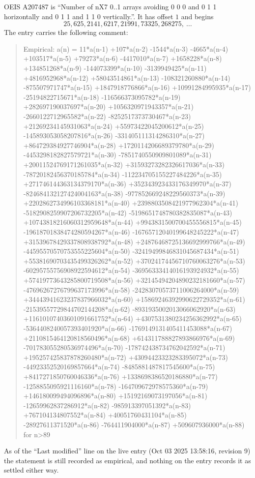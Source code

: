 \documentclass[11pt,a4paper]{article}
\theoremstyle{plain}
\theoremstyle{definition}
\begin{document}
OEIS A207487 is ``Number of nX7 0..1 arrays avoiding 0 0 0 and 0 1 1 horizontally and 0 1 1 and 1 1 0 vertically.''. It has offset
$1$ and begins
\[
25, 625, 2141, 6217, 21991, 73325, 268275,\ \dots
\]
The entry carries the following comment:
\begin{quote}\small
Empirical: a(n) = 11*a(n-1) +107*a(n-2) -1544*a(n-3) -4665*a(n-4) +103517*a(n-5) +79273*a(n-6) -4417010*a(n-7) +1658228*a(n-8) +134851268*a(n-9) -144073399*a(n-10) -3139949425*a(n-11) +4816952968*a(n-12) +58043514861*a(n-13) -108321260880*a(n-14) -875507971747*a(n-15) +1847918776866*a(n-16) +10991284995935*a(n-17) -25194822715671*a(n-18) -116566373095782*a(n-19) +282697190037697*a(n-20) +1056320971943357*a(n-21) -2660122712965582*a(n-22) -8252517373730467*a(n-23) +21269234145931063*a(n-24) +55973422045200612*a(n-25) -145893053058207816*a(n-26) -331405111314286310*a(n-27) +864729384927746904*a(n-28) +1720114206689379780*a(n-29) -4453298182827579721*a(n-30) -7851740550909801089*a(n-31) +20011524769171261035*a(n-32) +31593273282326617036*a(n-33) -78720182456370185784*a(n-34) -112234705155227484226*a(n-35) +271746144363134379170*a(n-36) +352343923433176349970*a(n-37) -824684132127424004163*a(n-38) -977852669248229560373*a(n-39) +2202862734996103368181*a(n-40) +2398803508421977962304*a(n-41) -5182908259907206732205*a(n-42) -5198651748780382835087*a(n-43) +10743818216060312959648*a(n-44) +9943831500700455556815*a(n-45) -19618701838474280594267*a(n-46) -16765712040199648245222*a(n-47) +31539678429337808938792*a(n-48) +24876468725136692999766*a(n-49) -44595570570753555225604*a(n-50) -32419499846831045687434*a(n-51) +55381690703435499326262*a(n-52) +37024174456710760063276*a(n-53) -60295755756908922594612*a(n-54) -36956333414016193924932*a(n-55) +57419773643285800719508*a(n-56) +32145494204890232181660*a(n-57) -47696267276799637173996*a(n-58) -24283070573711006264000*a(n-59) +34443941623237837966032*a(n-60) +15869246392990622729352*a(n-61) -21539557729844702144208*a(n-62) -8931935002013066062920*a(n-63) +11610107403601091661752*a(n-64) +4307531380234256362992*a(n-65) -5364408240057393401920*a(n-66) -1769149131405411453088*a(n-67) +2110815464120818560496*a(n-68) +614311788827893866976*a(n-69) -701783055280536974496*a(n-70) -178742438734762042592*a(n-71) +195257425837878260480*a(n-72) +43094423323283395072*a(n-73) -44923352520169857664*a(n-74) -8485881487817545600*a(n-75) +8417271850760046336*a(n-76) +1338698386520186880*a(n-77) -1258855095921116160*a(n-78) -164709672978575360*a(n-79) +146180099494096896*a(n-80) +15192169073197056*a(n-81) -12659962837286912*a(n-82) -985913397051392*a(n-83) +767104134807552*a(n-84) +40051760431104*a(n-85) -28927611371520*a(n-86) -764411904000*a(n-87) +509607936000*a(n-88) for n>89
\end{quote}
As of the ``Last modified'' line on the live entry (Oct 03 2025 13:58:16, revision
9) the statement is still recorded as empirical, and nothing on the entry
records it as settled either way.
\end{document}
